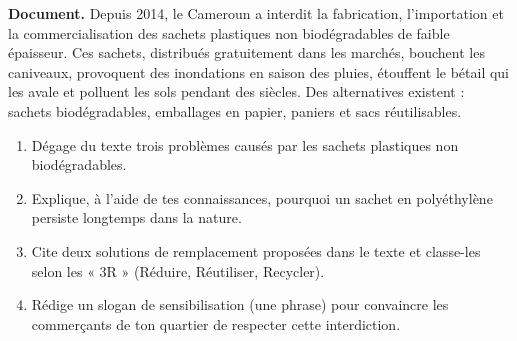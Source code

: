 \documentclass[11pt]{article}
\begin{document}
\begin{exercice}
\textbf{Document.} Depuis 2014, le Cameroun a interdit la fabrication, l'importation et la commercialisation des sachets plastiques non biodégradables de faible épaisseur. Ces sachets, distribués gratuitement dans les marchés, bouchent les caniveaux, provoquent des inondations en saison des pluies, étouffent le bétail qui les avale et polluent les sols pendant des siècles. Des alternatives existent : sachets biodégradables, emballages en papier, paniers et sacs réutilisables.

\begin{enumerate}
\item Dégage du texte trois problèmes causés par les sachets plastiques non biodégradables.
\item Explique, à l'aide de tes connaissances, pourquoi un sachet en polyéthylène persiste longtemps dans la nature.
\item Cite deux solutions de remplacement proposées dans le texte et classe-les selon les « 3R » (Réduire, Réutiliser, Recycler).
\item Rédige un slogan de sensibilisation (une phrase) pour convaincre les commerçants de ton quartier de respecter cette interdiction.
\end{enumerate}
\end{exercice}
\end{document}
